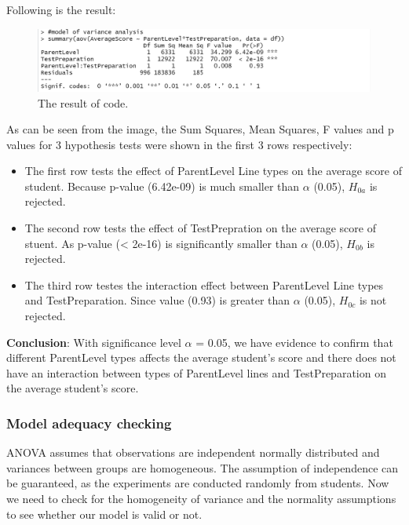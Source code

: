 \documentclass[a4paper]{article}
\begin{document}
Following is the result:
\begin{figure}[H]
    \centering
    \includegraphics[scale = 0.7]{Images/Activity2/21.png}
    \caption{The result of code.}
    \label{fig:analysis2}
\end{figure}
As can be seen from the image, the Sum Squares, Mean Squares, F values and p values for 3 hypothesis tests were shown in the first 3 rows respectively:
\begin{itemize}
    \item The first row tests the effect of ParentLevel Line types on the average score of student. Because p-value (6.42e-09) is much smaller than $\alpha$ (0.05), \textit{$H_{0a}$} is rejected.
    \item The second row tests the effect of TestPrepration on the average score of stuent. As p-value (< 2e-16) is significantly smaller than $\alpha$ (0.05), \textit{$H_{0b}$} is rejected.
    \item The third row testes the interaction effect between ParentLevel Line types and TestPreparation. Since value (0.93) is greater than $\alpha$ (0.05), \textit{$H_{0c}$} is not rejected. \\
\end{itemize}
\textbf{Conclusion}: With significance level $\alpha$ = 0.05, we have evidence to confirm that different ParentLevel types affects the average student's score and there does not have an interaction between types of ParentLevel lines and TestPreparation on the average student's score.


\subsubsection{Model adequacy checking}
\vspace{0.4cm}
ANOVA assumes that observations are independent normally distributed and variances between groups are homogeneous. The assumption of independence can be guaranteed, as the experiments are conducted randomly from students. Now we need to check for the homogeneity of variance and the normality assumptions to see whether our model is valid or not. \\ \newline
\end{document}
